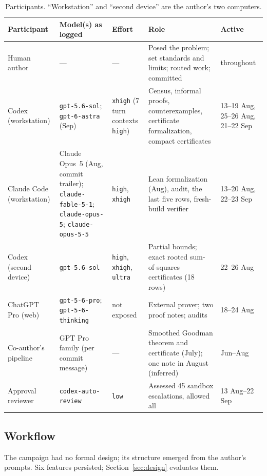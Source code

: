 \documentclass[11pt,a4paper]{article}
\newcommand{\ttt}[1]{\texttt{#1}}
\begin{document}
\begin{table}[t]
\centering\small
\caption{Participants. ``Workstation'' and ``second device'' are the author's two computers.}
\label{tab:participants}
\begin{tabularx}{\linewidth}{@{}P{2.6cm}P{3.3cm}P{1.5cm}YP{1.7cm}@{}}
\toprule
Participant & Model(s) as logged & Effort & Role & Active\\ \midrule
Human author & --- & --- & Posed the problem; set standards and limits; routed work; committed & throughout\\
Codex (workstation) & \ttt{gpt-5.6-sol}; \ttt{gpt-6-astra} (Sep) & \ttt{xhigh} (7 turn contexts \ttt{high}) & Census, informal proofs, counterexamples, certificate formalization, compact certificates & 13--19 Aug, 25--26 Aug, 21--22 Sep\\
Claude Code (workstation) & Claude Opus~5 (Aug, commit trailer); \ttt{claude-fable-5-1}; \ttt{claude-opus-5}; \ttt{claude-opus-5-5} & \ttt{high}, \ttt{xhigh} & Lean formalization (Aug), audit, the last five rows, fresh-build verifier & 13--20 Aug, 22--23 Sep\\
Codex (second device) & \ttt{gpt-5.6-sol} & \ttt{high}, \ttt{xhigh}, \ttt{ultra} & Partial bounds; exact rooted sum-of-squares certificates (18 rows) & 22--26 Aug\\
ChatGPT Pro (web) & \ttt{gpt-5-6-pro}; \ttt{gpt-5-6-thinking} & not exposed & External prover; two proof notes; audits & 18--24 Aug\\
Co-author's pipeline & GPT Pro family (per commit message) & --- & Smoothed Goodman theorem and certificate (July); one note in August (inferred) & Jun--Aug\\
Approval reviewer & \ttt{codex-auto-review} & \ttt{low} & Assessed 45 sandbox escalations, allowed all & 13 Aug--22 Sep\\
\bottomrule
\end{tabularx}
\end{table}

\subsection{Workflow}

The campaign had no formal design; its structure emerged from the author's prompts. Six features persisted;
Section~\ref{sec:design} evaluates them.
\end{document}

